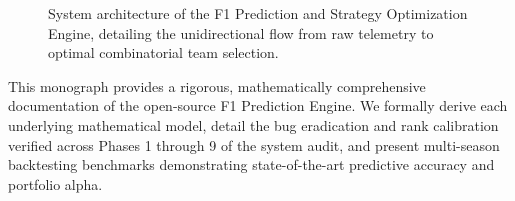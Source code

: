 \begin{figure}[t]
\centering
{}
\caption{System architecture of the F1 Prediction and Strategy Optimization Engine, detailing the unidirectional flow from raw telemetry to optimal combinatorial team selection.}
\label{fig:pipeline_architecture}
\end{figure}

This monograph provides a rigorous, mathematically comprehensive documentation of the open-source F1 Prediction Engine. We formally derive each underlying mathematical model, detail the bug eradication and rank calibration verified across Phases 1 through 9 of the system audit, and present multi-season backtesting benchmarks demonstrating state-of-the-art predictive accuracy and portfolio alpha.
